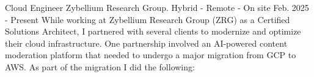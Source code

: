 

\begin{cventries}

  \cventry
    {Cloud Engineer} %
    {Zybellium Research Group.} %
    {Hybrid - Remote - On site} %
    {Feb. 2025 - Present} %
    {
          While working at Zybellium Research Group (ZRG) as a Certified Solutions Architect, I partnered with several clients to modernize and optimize their cloud infrastructure. One partnership involved an AI-powered content moderation platform that needed to undergo a major migration from GCP to AWS. As part of the migration I did the following:
}
\end{cventries}
